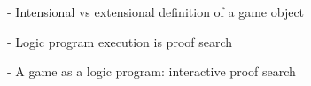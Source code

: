 
- Intensional vs extensional definition of a game object

- Logic program execution is proof search

- A game as a logic program: interactive proof search


